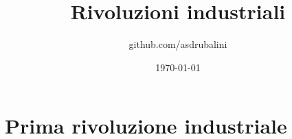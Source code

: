 \documentclass{article}
\title{Rivoluzioni industriali}
\author{github.com/asdrubalini}
\date{\today}
\begin{document}
    \maketitle

    \section{Prima rivoluzione industriale}


    
\end{document}

